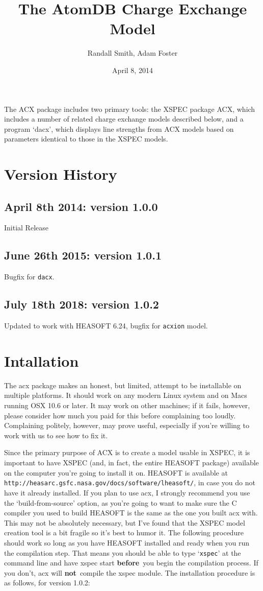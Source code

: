 \documentclass[11pt]{article}
\title{The AtomDB Charge Exchange Model}
\author{Randall Smith, Adam Foster}
\date{April 8, 2014}
\newcommand{\version}{1.0.2}
\begin{document}
\maketitle

The ACX package includes two primary tools: the XSPEC package ACX, which
includes a number of related charge exchange models described below,
and a program `dacx', which displays line strengths from ACX models
based on parameters identical to those in the XSPEC models.  

\section*{Version History}
\subsection*{April 8th 2014: version 1.0.0}
Initial Release
\subsection*{June 26th 2015: version 1.0.1}
Bugfix for \texttt{dacx}.
\subsection*{July 18th 2018: version 1.0.2}
Updated to work with HEASOFT 6.24, bugfix for \texttt{acxion} model.


\section*{Intallation}

The acx package makes an honest, but limited, attempt to be installable
on multiple platforms.  It should work on any modern Linux system and
on Macs running OSX 10.6 or later.  It may work on other machines; if
it fails, however, please consider how much you paid for this before
complaining too loudly.  Complaining politely, however, may prove
useful, especially if you're willing to work with us to see how to fix
it.

Since the primary purpose of ACX is to create a model usable in XSPEC,
it is important to have XSPEC (and, in fact, the entire HEASOFT
package) available on the computer you're going to install it on.
HEASOFT is available at {\tt
http://heasarc.gsfc.nasa.gov/docs/software/lheasoft/}, in case you do
not have it already installed.  If you plan to use acx, I strongly
recommend you use the `build-from-source' option, as you're going to
want to make sure the C compiler you used to build HEASOFT is the same
as the one you built acx with.  This may not be absolutely necessary,
but I've found that the XSPEC model creation tool is a bit fragile so
it's best to humor it.  The following procedure should work so long as
you have HEASOFT installed and ready when you run the compilation
step.  That means you should be able to type `{\tt xspec}' at the
command line and have xspec start {\bf before}\ you begin the
compilation process.  If you don't, acx will {\bf not}\ compile the
xspec module.  The installation procedure is as follows, for version
\version:
\end{document}
